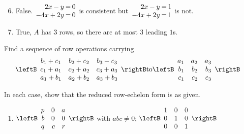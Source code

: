 \begin{multicols}{2}
\begin{ex}
\begin{sol}
\begin{enumerate}[label={\alph*.}]
\setcounter{enumi}{5}
\item  False.
$\arraycolsep=1pt
\begin{array}{rcl}
 	 2x - y & = & 0 \\
	-4x + 2y & = & 0 \\
\end{array}$ is consistent but $\arraycolsep=1pt
\begin{array}{rcl}
	 2x - y & = & 1 \\
	-4x + 2y & = & 1 \\
\end{array}$ is not.

\setcounter{enumi}{7}
\item  True, $A$ has 3 rows, so there are at most 3 leading $1$s.

\end{enumerate}
\end{sol}
\end{ex}

\begin{ex}
Find a sequence of row operations carrying
\begin{equation*}
\leftB \begin{array}{ccc}
	b_1 + c_1 & b_2 + c_2 & b_3 + c_3 \\
	c_1 + a_1 & c_2 + a_2 & c_3 + a_3 \\
	a_1 + b_1 & a_2 + b_2 & a_3 + b_3 
\end{array} \rightB
\mbox{to}
\leftB \begin{array}{rrr}
	a_1 & a_2 & a_3 \\
	b_1 & b_2 & b_3 \\
	c_1 & c_2 & c_3 
\end{array} \rightB
\end{equation*}
\end{ex}

\begin{ex}
In each case, show that the reduced row-echelon form is as given.

\begin{enumerate}[label={\alph*.}]
\item 
$\leftB \begin{array}{rrr}
	p & 0 & a \\
	b & 0 & 0 \\
	q & c & r
\end{array} \rightB$ with $abc \neq 0$; $
\leftB \begin{array}{rrr}
1 & 0 & 0 \\
0 & 1 & 0 \\
0 & 0 & 1 
\end{array} \rightB$


\end{enumerate}
\end{ex}
\end{multicols}
